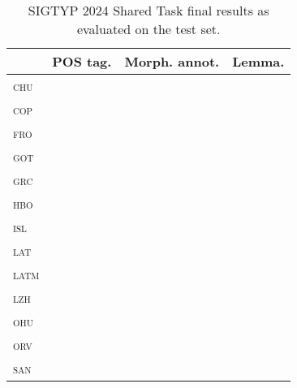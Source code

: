 \documentclass{../acl_latex.tex}
\begin{document}
\begin{table}[t]
\centering
\begin{tabular}{lccc}
\toprule
                 & POS tag. & Morph. annot. & Lemma. \\ \midrule
\textsc{chu}     &          &               &        \\ 
\textsc{cop}     &          &               &        \\ 
\textsc{fro}     &          &               &        \\
\textsc{got}     &          &               &        \\
\textsc{grc}     &          &               &        \\
\textsc{hbo}     &          &               &        \\
\textsc{isl}     &          &               &        \\
\textsc{lat}     &          &               &        \\
\textsc{latm}    &          &               &        \\
\textsc{lzh}     &          &               &        \\
\textsc{ohu}     &          &               &        \\
\textsc{orv}     &          &               &        \\
\textsc{san}     &          &               &        \\ \bottomrule 
\end{tabular}
\caption{
    SIGTYP 2024 Shared Task final results as evaluated on the test set.
}
\label{table:main_results}
\end{table}
\end{document}

